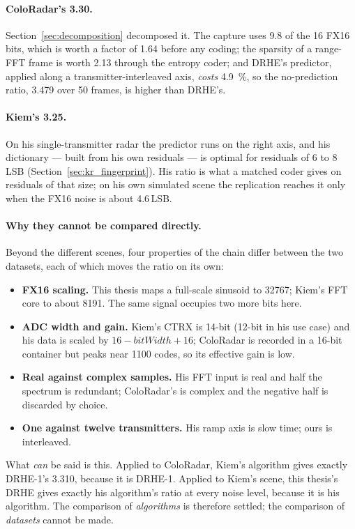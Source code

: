 \paragraph{ColoRadar's 3.30.} Section~\ref{sec:decomposition} decomposed it.
The capture uses 9.8 of the 16 FX16 bits, which is worth a factor of \num{1.64}
before any coding; the sparsity of a range-FFT frame is worth \num{2.13}
through the entropy coder; and DRHE's predictor, applied along a
transmitter-interleaved axis, \emph{costs} \SI{4.9}{\percent}, so the no-prediction ratio, 3.479 over
50 frames, is higher than DRHE's.

\paragraph{Kiem's 3.25.} On his single-transmitter radar the predictor runs on
the right axis, and his dictionary --- built from his own residuals --- is
optimal for residuals of 6 to 8\,LSB (Section~\ref{sec:kr_fingerprint}). His
ratio is what a matched coder gives on residuals of that size; on his own
simulated scene the replication reaches it only when the FX16 noise is about
4.6\,LSB.

\paragraph{Why they cannot be compared directly.} Beyond the different scenes,
four properties of the chain differ between the two datasets, each of which moves
the ratio on its own:

\begin{itemize}
\item \textbf{FX16 scaling.} This thesis maps a full-scale sinusoid to 32767;
Kiem's FFT core to about 8191. The same signal occupies two more bits here.
\item \textbf{ADC width and gain.} Kiem's CTRX is 14-bit (12-bit in his use
case) and his data is scaled by $16 - \mathit{bitWidth} + 16$; ColoRadar is
recorded in a 16-bit container but peaks near 1100 codes, so its effective
gain is low.
\item \textbf{Real against complex samples.} His FFT input is real and half the
spectrum is redundant; ColoRadar's is complex and the negative half is
discarded by choice.
\item \textbf{One against twelve transmitters.} His ramp axis is slow time; ours
is interleaved.
\end{itemize}

\noindent
What \emph{can} be said is this. Applied to ColoRadar, Kiem's algorithm gives
exactly DRHE-1's 3.310, because it is DRHE-1. Applied to Kiem's scene, this
thesis's DRHE gives exactly his algorithm's ratio at every noise level, because
it is his algorithm. The comparison of \emph{algorithms} is therefore settled;
the comparison of \emph{datasets} cannot be made.

